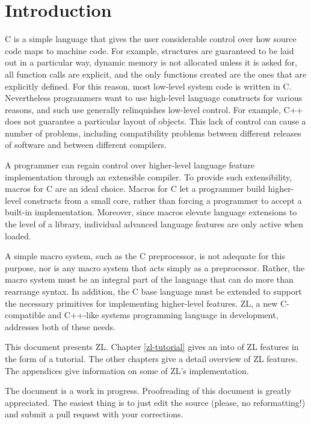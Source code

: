 \chapter{Introduction}
\label{intro}

C is a simple language that gives the user considerable control
over how source code maps to machine code.  For example, structures are
guaranteed to be laid out in a particular way, dynamic memory is not
allocated unless it is asked for, all function calls are explicit, and
the only functions created are the ones that are explicitly defined.
For this reason, most low-level system code is written in C.  Nevertheless
programmers want to use high-level language constructs for various
reasons, and such use generally relinquishes low-level control.
For example, C++ does not guarantee a particular layout of objects.
This lack of control can cause a number of problems, including
compatibility problems between different releases of software and
between different compilers.

A programmer can regain control over higher-level language feature
implementation through an extensible compiler.  To provide such
extensibility, macros for C are an ideal choice.  Macros for C let a
programmer build higher-level constructs from a small core, rather
than forcing a programmer to accept a built-in
implementation. Moreover, since macros elevate language extensions to
the level of a library, individual advanced language features are only
active when loaded.

A simple macro system, such as the C preprocessor, is not adequate for
this purpose, nor is any macro system that acts simply as a
preprocessor.  Rather, the macro system must be an integral part of
the language that can do more than rearrange syntax.  In addition, the
C base language must be extended to support the necessary primitives
for implementing higher-level features.  ZL, a new C-compatible and
C++-like systems programming language in development, addresses both
of these needs.

This document presents ZL.  Chapter \ref{zl-tutorial} gives an into of
ZL features in the form of a tutorial.  The other chapters give a
detail overview of ZL features.  The appendices give information on
some of ZL's implementation.

The document is a work in progress.  Proofreading of this document is
greatly appreciated.  The easiest thing is to just edit the source
(please, no reformatting!) and submit a pull request with
your corrections.


